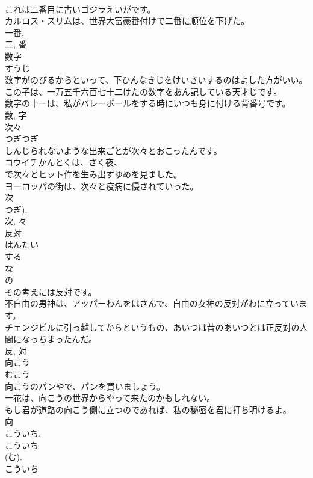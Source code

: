 \documentclass[8pt]{extreport}
\begin{document}
\begin{CJK}{UTF8}{min}
\\	これは二番目に古いゴジラえいがです。	
\\	カルロス・スリムは、世界大富豪番付けで二番に順位を下げた。	
\\	一番, 
\\	二, 番	
\\	数字	
\\	すうじ	
\\	数字がのびるからといって、下ひんなきじをけいさいするのはよした方がいい。	
\\	この子は、一万五千六百七十二けたの数字をあん記している天才じです。	
\\	数字の十一は、私がバレーボールをする時にいつも身に付ける背番号です。	
\\	数, 字	
\\	次々	
\\	つぎつぎ	
\\	しんじられないような出来ごとが次々とおこったんです。	
\\	コウイチかんとくは、さく夜、
\\	で次々とヒット作を生み出すゆめを見ました。	
\\	ヨーロッパの街は、次々と疫病に侵されていった。	
\\	次 
\\	つぎ), 
\\	次, 々	
\\	反対	
\\	はんたい	
\\	する 
\\	な 
\\	の 
\\	その考えには反対です。	
\\	不自由の男神は、アッパーわんをはさんで、自由の女神の反対がわに立っています。	
\\	チェンジビルに引っ越してからというもの、あいつは昔のあいつとは正反対の人間になっちまったんだ。	
\\	反, 対	
\\	向こう	
\\	むこう	
\\	向こうのパンやで、パンを買いましょう。	
\\	一花は、向こうの世界からやって来たのかもしれない。	
\\	もし君が道路の向こう側に立つのであれば、私の秘密を君に打ち明けるよ。	
\\	向 
\\	こういち.
\\	こういち 
\\	(む). 
\\	こういち 

\end{CJK}
\end{document}
